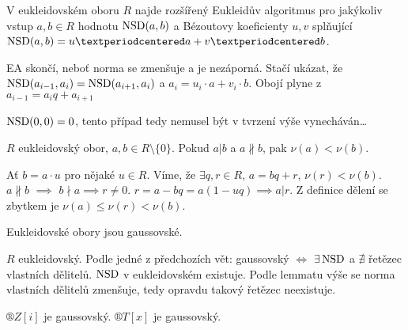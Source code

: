 \documentclass[12pt]{article}                   %
\begin{document}
        \begin{veta}
            V eukleidovském oboru $R$ najde rozšířený Eukleidův algoritmus pro jakýkoliv vstup $a, b \in R$ hodnotu $\operatorname{NSD}(a, b)$ a Bézoutovy koeficienty $u, v$ splňující $\NSD(a, b) = u·a + v·b$.

            \begin{dukazin}
                EA skončí, neboť norma se zmenšuje a je nezáporná. Stačí ukázat, že $\operatorname{NSD}(a_{i-1}, a_i) = \operatorname{NSD}(a_{i+1}, a_i)$ a $a_i = u_i·a + v_i·b$. Obojí plyne z $a_{i-1} = a_{i}q+a_{i+1}$
            \end{dukazin}
        \end{veta}


        \begin{poznamka}[Oprava]
            $\operatorname{NSD}(0, 0) = 0$, tento případ tedy nemusel být v tvrzení výše vynecháván…
        \end{poznamka}

        \begin{lemma}
            $R$ eukleidovský obor, $a, b \in R \setminus \{0\}$. Pokud $a|b$ a $a \nparallel b$, pak $\nu(a) < \nu(b)$.

            \begin{dukazin}
                Ať $b = a·u$ pro nějaké $u \in R$. Víme, že $\exists q, r \in R$, $a = bq + r$, $\nu(r) < \nu(b)$. $a\nparallel b$ $\implies$ $b \nmid a \implies r≠0$. $r = a-bq = a(1-uq) \implies a|r$. Z definice dělení se zbytkem je $\nu(a) ≤ \nu(r) < \nu(b)$.
            \end{dukazin}
        \end{lemma}

        \begin{veta}
            Eukleidovské obory jsou gaussovské.

            \begin{dukazin}
                $R$ eukleidovský. Podle jedné z předchozích vět: gaussovský $\Leftrightarrow$ $\exists \operatorname{NSD}$ a $\nexists$ řetězec vlastních dělitelů. $\operatorname{NSD}$ v eukleidovském existuje. Podle lemmatu výše se norma vlastních dělitelů zmenšuje, tedy opravdu takový řetězec neexistuje.
            \end{dukazin}
        \end{veta}

        \begin{dusledek}
            $®Z[i]$ je gaussovský. $®T[x]$ je gaussovský.
        \end{dusledek}
\end{document}
